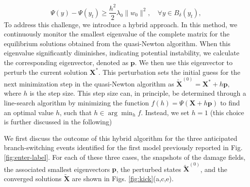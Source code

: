 $$
\Psi(y)-\Psi(y_t)\geq \frac{h^2}{2}\lambda_0 \|w_0\|^2, \quad \forall y \in B_{\delta}(y_t),
$$
To address this challenge, we introduce a hybrid approach. In this method, we continuously monitor the smallest eigenvalue of the complete  matrix for the equilibrium solutions obtained from the quasi-Newton algorithm. 
When this eigenvalue significantly diminishes, indicating potential instability, we calculate the corresponding eigenvector, denoted as \(\mathbf{p}\). We then use this eigenvector to perturb the current solution $\mathbf{X^*}$. This perturbation sets the initial guess for the next minimization step in the quasi-Newton algorithm as $\mathbf{\tilde X}^{(0)} = \mathbf{X^*} + h \mathbf{p},
$ where \(h\) is the step size.
This step size can, in principle, be determined through a line-search algorithm by minimizing the function $f(h) = \Psi(\mathbf{X} + h \mathbf{p})$ to find an optimal value \(h\), such that $h \in \arg \min_{h} f$. Instead, we   set \(h = 1\)  (this choice is further discussed in the following) 

We first discuss the outcome of this hybrid algorithm for the three anticipated branch-switching events identified for the first model previously reported in Fig. \ref{fig:enter-label}. For each of these three cases, the snapshots of the damage fields, the associated smallest eigenvectors \(\mathbf{p}\),  the perturbed states \(\mathbf{\tilde X}^{(0)}\), and the converged solutions $\mathbf{\tilde X}$ are shown in Figs. \ref{fig:kick}(a,c,e).

